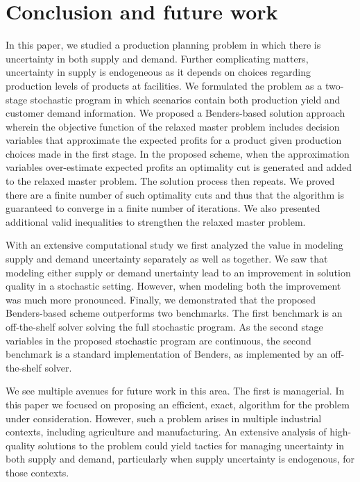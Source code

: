 \documentclass[12pt]{article}
\theoremstyle{thmstylethree}%
\begin{document}
\section{Conclusion and future work}
\label{sec:conclusion_future}
\noindent
In this paper, we studied a production planning problem in which there is uncertainty in both supply and demand. Further complicating matters, uncertainty in supply is endogeneous as it depends on choices regarding production levels of products at facilities. We formulated the problem as a two-stage stochastic program in which scenarios contain both production yield and customer demand information. We proposed a Benders-based solution approach wherein the objective function of the relaxed master problem includes decision variables that approximate the expected profits for a product given production choices made in the first stage. In the proposed scheme, when the approximation variables over-estimate expected profits an optimality cut is generated and added to the relaxed master problem. The solution process then repeats. We proved there are a finite number of such optimality cuts and thus  that the algorithm is guaranteed to converge in a finite number of iterations. We also presented additional valid inequalities to strengthen the relaxed master problem. 

With an extensive computational study we first analyzed the value in modeling supply and demand uncertainty separately as well as together. We saw that modeling either supply or demand unertainty lead to an improvement in solution quality in a stochastic setting. However, when modeling both the improvement was much more pronounced. Finally, we demonstrated that the proposed Benders-based scheme outperforms two benchmarks. The first benchmark is an off-the-shelf solver solving the full stochastic program. As the second stage variables in the proposed stochastic program are continuous, the second benchmark is a standard implementation of Benders, as implemented by an off-the-shelf solver. 

We see multiple avenues for future work in this area. The first is managerial. In this paper we focused on proposing an efficient, exact, algorithm for the problem under consideration. However, such a problem arises in multiple industrial contexts, including agriculture and manufacturing. An extensive analysis of high-quality solutions to the problem could yield tactics for managing uncertainty in both supply and demand, particularly when supply uncertainty is endogenous, for those contexts. 
\end{document}
